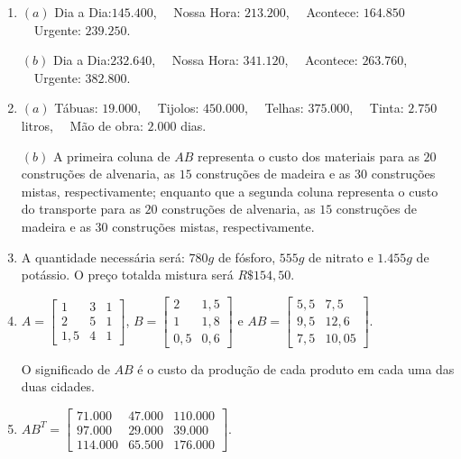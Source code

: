 \documentclass{report}
\begin{document}
\begin{enumerate}
\item $(a)$ Dia a Dia:$145.400$, \ \ Nossa Hora: $213.200$, \ \
Acontece: $164.850$ \ \ Urgente: $239.250$.

$(b)$ Dia a Dia:$232.640$, \ \ Nossa Hora: $341.120$, \ \
Acontece: $263.760$, \ \ Urgente: $382.800$.



\item $(a)$ Tábuas: $19.000$, \ \ Tijolos: $450.000$, \ \ Telhas:
$375.000$, \ \ Tinta: $2.750$ litros, \ \ Mão de obra: $2.000$
dias.

$(b)$ A primeira coluna de $AB$ representa o custo dos materiais
para as $20$ construções de alvenaria, as $15$ construções de
madeira e as $30$ construções mistas, respectivamente; enquanto
que a segunda coluna representa o custo do transporte para as $20$
construções de alvenaria, as $15$ construções de madeira e as $30$
construções mistas, respectivamente.


\item A quantidade necessária será: $780 g$ de fósforo, $555 g$ de
nitrato e $1.455 g$ de potássio. O preço totalda mistura será $
R\$154,50.$




\item $A=\left[
\begin{array}{rrr}
1 & 3 & 1 \\
2 & 5 & 1 \\
1,5 & 4 & 1
\end{array}
\right]$,  $B=\left[
\begin{array}{rr}
2 & 1,5 \\
1 & 1,8 \\
0,5 & 0,6
\end{array}
\right]$ e $AB=\left[
\begin{array}{rr}
5,5 & 7,5 \\
9,5 & 12,6 \\
7,5 & 10,05
\end{array}
\right].$

O significado de $AB$ é o custo da produção de cada produto em
cada uma das duas cidades.



\item $AB^T=\left[
\begin{array}{rrr}
71.000 & 47.000 & 110.000 \\
97.000 & 29.000 & 39.000 \\
114.000 & 65.500 & 176.000
\end{array}
\right].$

\end{enumerate}
\end{document}

